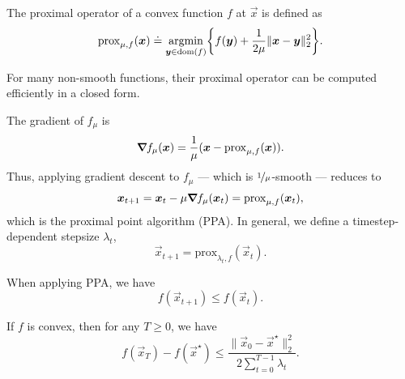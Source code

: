 \begin{definition}
    The proximal operator of a convex function $f$ at $\vec{x}$ is defined as \[
        \mathrm{prox}_{\mu,f}(\vec{x}) \doteq \argmin_{\vec{y} \in \dom{f}} \lft\{ f(\vec{y}) + \frac{1}{2 \mu} \| \vec{x} - \vec{y} \|_2^2 \rgt\}.
    \]
\end{definition}
For many non-smooth functions, their proximal operator can be computed efficiently in a closed form.

The gradient of $f_{\mu}$ is \[
    \bm{\nabla}_{\! } f_{\mu}(\bm{x}) = \frac{1}{\mu} (\bm{x} - \mathrm{prox}_{\mu, f}(\bm{x})).
\]
Thus, applying gradient descent to $f_{\mu}$ --- which is $\nicefrac{1}{\mu}$-smooth --- reduces to \[
    \bm{x}_{t+1} = \bm{x}_t - \mu \bm{\nabla}_{\! } f_{\mu}(\bm{x}_t) = \mathrm{prox}_{\mu, f}(\bm{x}_t),
\]
which is the proximal point algorithm (PPA). In general, we define a timestep-dependent stepsize
$\lambda_t$, \[
    \vec{x}_{t+1} = \mathrm{prox}_{\lambda_t, f}(\vec{x}_t).
\]

\begin{lemma}
    \label{lem:ppa-descent}

    When applying PPA, we have \[
        f(\vec{x}_{t+1}) \leq f(\vec{x}_t).
    \]
\end{lemma}

\begin{theorem}
    If $f$ is convex, then for any $T \geq 0$, we have \[
        f(\vec{x}_T) - f(\vec{x}^\star) \leq \frac{\| \vec{x}_0 - \vec{x}^\star \|_2^2}{2 \sum_{t=0}^{T-1} \lambda_t}.
    \]
\end{theorem}

